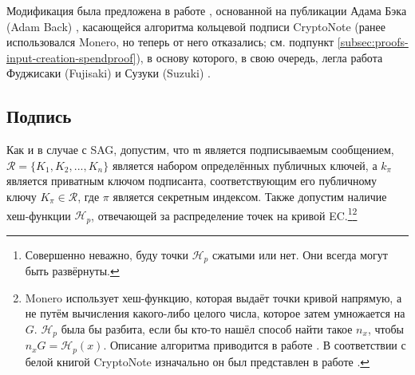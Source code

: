 Модификация была предложена в работе \cite{MRL-0005-ringct}, основанной на публикации Адама Бэка (Adam Back) \cite{AdamBack-ring-efficiency}, касающейся алгоритма кольцевой подписи CryptoNote \cite{cryptoNoteWhitePaper} (ранее использовался Monero, но теперь от него отказались; см. подпункт \ref{subsec:proofs-input-creation-spendproof}), в основу которого, в свою очередь, легла работа Фуджисаки (Fujisaki) и Сузуки (Suzuki) \cite{Fujisaki2007}.


\subsection*{Подпись}

Как и в случае с SAG, допустим, что \(\mathfrak{m}\) является подписываемым сообщением, \linebreak \(\mathcal{R} = \{K_1, K_2, ..., K_n\}\) является набором определённых публичных ключей, а \(k_\pi\) является приватным ключом подписанта, соответствующим его публичному ключу \(K_\pi \in \mathcal{R}\), где $\pi$ является секретным индексом. Также допустим наличие хеш-функции \(\mathcal{H}_p\), отвечающей за распределение точек на кривой EC.\footnote{Совершенно неважно, буду точки $\mathcal{H}_p$ сжатыми или нет. Они всегда могут быть развёрнуты.}\footnote{Monero использует хеш-функцию, которая выдаёт точки кривой напрямую, а не путём вычисления какого-либо целого числа, которое затем умножается на $G$. $\mathcal{H}_p$ была бы разбита, если бы кто-то нашёл способ найти такое $n_x$, чтобы $n_x G = \mathcal{H}_p(x)$. Описание алгоритма приводится в работе \cite{hashtopoint-writeup}. В соответствии с белой книгой CryptoNote \cite{cryptoNoteWhitePaper} изначально он был представлен в работе \cite{hashtopoint-original-paper}.}

